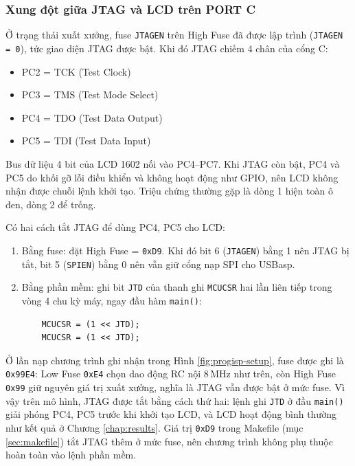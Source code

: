 \subsubsection{Xung đột giữa JTAG và LCD trên PORT C}
\label{sec:jtag}
Ở trạng thái xuất xưởng, fuse \texttt{JTAGEN} trên High Fuse đã được lập trình (\texttt{JTAGEN = 0}), tức giao diện JTAG được bật. Khi đó JTAG chiếm 4 chân của cổng C:
\begin{itemize}[leftmargin=1.2cm]
    \item PC2 = TCK (Test Clock)
    \item PC3 = TMS (Test Mode Select)
    \item PC4 = TDO (Test Data Output)
    \item PC5 = TDI (Test Data Input)
\end{itemize}

Bus dữ liệu 4 bit của LCD 1602 nối vào PC4--PC7. Khi JTAG còn bật, PC4 và PC5 do khối gỡ lỗi điều khiển và không hoạt động như GPIO, nên LCD không nhận được chuỗi lệnh khởi tạo. Triệu chứng thường gặp là dòng 1 hiện toàn ô đen, dòng 2 để trống.

Có hai cách tắt JTAG để dùng PC4, PC5 cho LCD:
\begin{enumerate}[leftmargin=1.2cm]
    \item Bằng fuse: đặt High Fuse = \texttt{0xD9}. Khi đó bit 6 (\texttt{JTAGEN}) bằng 1 nên JTAG bị tắt, bit 5 (\texttt{SPIEN}) bằng 0 nên vẫn giữ cổng nạp SPI cho USBasp.
    \item Bằng phần mềm: ghi bit \texttt{JTD} của thanh ghi \texttt{MCUCSR} hai lần liên tiếp trong vòng 4 chu kỳ máy, ngay đầu hàm \texttt{main()}:
    \begin{verbatim}
    MCUCSR = (1 << JTD);
    MCUCSR = (1 << JTD);
    \end{verbatim}
\end{enumerate}

Ở lần nạp chương trình ghi nhận trong Hình \ref{fig:progisp-setup}, fuse được ghi là \texttt{0x99E4}: Low Fuse \texttt{0xE4} chọn dao động RC nội 8\,MHz như trên, còn High Fuse \texttt{0x99} giữ nguyên giá trị xuất xưởng, nghĩa là JTAG vẫn được bật ở mức fuse. Vì vậy trên mô hình, JTAG được tắt bằng cách thứ hai: lệnh ghi \texttt{JTD} ở đầu \texttt{main()} giải phóng PC4, PC5 trước khi khởi tạo LCD, và LCD hoạt động bình thường như kết quả ở Chương \ref{chap:results}. Giá trị \texttt{0xD9} trong Makefile (mục \ref{sec:makefile}) tắt JTAG thêm ở mức fuse, nên chương trình không phụ thuộc hoàn toàn vào lệnh phần mềm.

